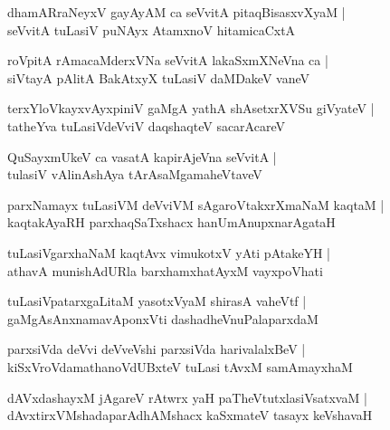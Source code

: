 \documentclass[twoside,12pt,openright]{book}
\newcounter{shloka}[chapter]
\begin{document}
\begin{shloka}%
dhamARraNeyxV gayAyAM ca seVvitA pitaqBisasxvXyaM |\\
seVvitA tuLasiV puNAyx AtamxnoV hitamicaCxtA 
\end{shloka}

\begin{shloka}%
roVpitA rAmacaMderxVNa seVvitA lakaSxmXNeVna ca |\\
siVtayA pAlitA BakAtxyX tuLasiV daMDakeV vaneV 
\end{shloka}

\begin{shloka}%
terxYloVkayxvAyxpiniV gaMgA yathA shAsetxrXVSu giVyateV |\\
tatheYva tuLasiVdeVviV daqshaqteV sacarAcareV 
\end{shloka}

\begin{shloka}%
QuSayxmUkeV ca vasatA kapirAjeVna seVvitA |\\
tulasiV vAlinAshAya tArAsaMgamaheVtaveV
\end{shloka}

\begin{shloka}%
parxNamayx tuLasiVM deVviVM sAgaroVtakxrXmaNaM kaqtaM |\\
kaqtakAyaRH parxhaqSaTxshacx hanUmAnupxnarAgataH 
\end{shloka}

\begin{shloka}%
tuLasiVgarxhaNaM kaqtAvx vimukotxV yAti pAtakeYH |\\
athavA munishAdURla barxhamxhatAyxM vayxpoVhati 
\end{shloka}

\begin{shloka}%
tuLasiVpatarxgaLitaM yasotxVyaM shirasA vaheVtf |\\
gaMgAsAnxnamavAponxVti dashadheVnuPalaparxdaM 
\end{shloka}

\begin{shloka}%
parxsiVda deVvi deVveVshi parxsiVda harivalalxBeV |\\
kiSxVroVdamathanoVdUBxteV tuLasi tAvxM samAmayxhaM 
\end{shloka}

\begin{shloka}%
dAVxdashayxM jAgareV rAtwrx yaH paTheVtutxlasiVsatxvaM |\\
dAvxtirxVMshadaparAdhAMshacx kaSxmateV tasayx keVshavaH 
\end{shloka}
\end{document}
